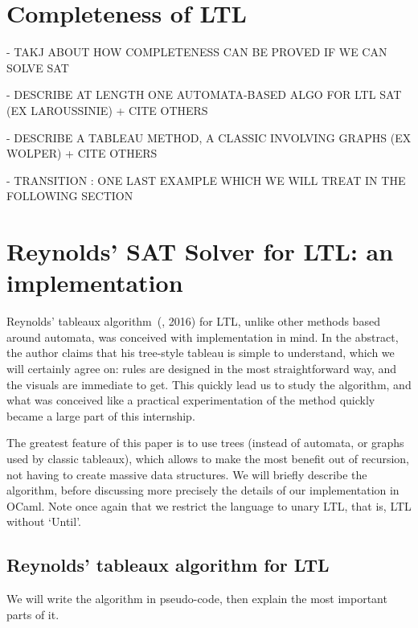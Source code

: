 \documentclass[11pt]{article}
\theoremstyle{definition}
\begin{document}
\section{Completeness of LTL}\label{SecLTLcomp}
 
- TAKJ ABOUT HOW COMPLETENESS CAN BE PROVED IF WE CAN SOLVE SAT

- DESCRIBE AT LENGTH ONE AUTOMATA-BASED ALGO FOR LTL SAT (EX LAROUSSINIE) + CITE OTHERS

- DESCRIBE A TABLEAU METHOD, A CLASSIC INVOLVING GRAPHS (EX WOLPER) + CITE OTHERS

- TRANSITION : ONE LAST EXAMPLE WHICH WE WILL TREAT IN THE FOLLOWING SECTION

\section{Reynolds' SAT Solver for LTL: an implementation}\label{SecOcaml}

Reynolds' tableaux algorithm~(\cite{ReyLTL}, 2016) for LTL, unlike other methods based around automata, was conceived
with implementation in mind. In the abstract, the author claims that his tree-style tableau is simple to understand, which we will
certainly agree on: rules are designed in the most straightforward way, and the visuals are immediate to get. This quickly lead us 
to study the algorithm, and what was conceived like a practical experimentation of the method quickly became a large part of this internship.

The greatest feature of this paper is to use trees (instead of automata, or graphs used by classic tableaux), which allows to
make the most benefit out of recursion, not having to create massive data structures. We will briefly describe the algorithm, before discussing
more precisely the details of our implementation in OCaml. Note once again that we restrict the language to unary LTL,
that is, LTL without `Until'.


\subsection{Reynolds' tableaux algorithm for LTL}

We will write the algorithm in pseudo-code, then explain the most important parts of it.\\
\end{document}

